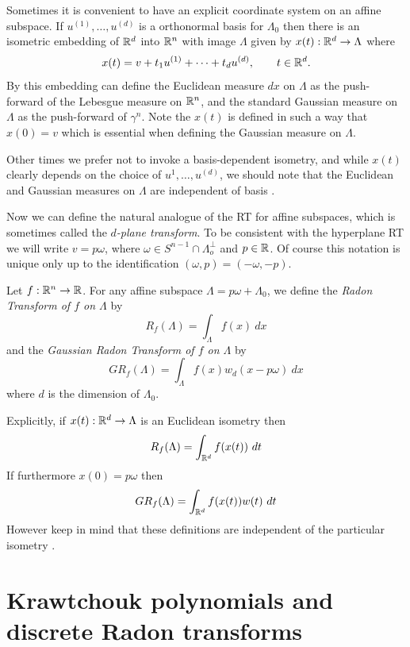 Sometimes it is convenient to have an explicit coordinate system on an affine subspace. If $u^{(1)}, \ldots, u^{(d)}$ is a orthonormal basis for $\Lambda_0$ then there is an isometric embedding of $\mathbb{R}^d$ into $\mathbb{R}^n$ with image $\Lambda$ given by $x(t) : \mathbb{R}^d \rightarrow \Lambda$ where
\[
  x(t) = v + t_1u^{(1)} + \cdots + t_d u^{(d)}, \qquad t \in \mathbb{R}^d.
\]
By this embedding can define the Euclidean measure $dx$ on $\Lambda$ as the push-forward of the Lebesgue measure on $\mathbb{R}^n$, and the standard Gaussian measure on $\Lambda$ as the push-forward of $\gamma^n$. Note the $x(t)$ is defined in such a way that $x(0) = v$ which is essential when defining the Gaussian measure on $\Lambda$.

Other times we prefer not to invoke a basis-dependent isometry, and while $x(t)$ clearly depends on the choice of $u^{1}, \ldots, u^{(d)}$, we should note that the Euclidean and Gaussian measures on $\Lambda$ are independent of basis \pn.


Now we can define the natural analogue of the RT for affine subspaces, which is sometimes called the \emph{$d$-plane transform}. To be consistent with the hyperplane RT we will write $v = p\omega$, where $\omega \in S^{n-1} \cap \Lambda_o^\perp$ and $p \in \mathbb{R}$. Of course this notation is unique only up to the identification $(\omega, p) = (-\omega, -p)$.

\begin{definition}
  Let $f:\mathbb{R}^n \rightarrow \mathbb{R}$. For any affine subspace $\Lambda = p\omega + \Lambda_0$, we define the \emph{Radon Transform of $f$ on $\Lambda$} by
  \[
    R_f(\Lambda) = \int_{\Lambda} f(x)~dx
  \]
  and the \emph{Gaussian Radon Transform of $f$ on $\Lambda$} by 
  \[
    GR_f(\Lambda) = \int_{\Lambda} f(x) w_d(x - p\omega) ~dx
  \]
  where $d$ is the dimension of $\Lambda_0$.
\end{definition}
\begin{remark}
  Explicitly, if $x(t): \mathbb{R}^d \rightarrow \Lambda$ is an Euclidean isometry then 
  \[
    R_f(\Lambda) = \int_{\mathbb{R}^d} f(x(t))~dt
  \]
  If furthermore $x(0) = p\omega$ then
  \[
    GR_f(\Lambda) = \int_{\mathbb{R}^d} f(x(t))w(t)~dt
  \]
  However keep in mind that these definitions are independent of the particular isometry \pn.
\end{remark}


\section{Krawtchouk polynomials and discrete Radon transforms}


